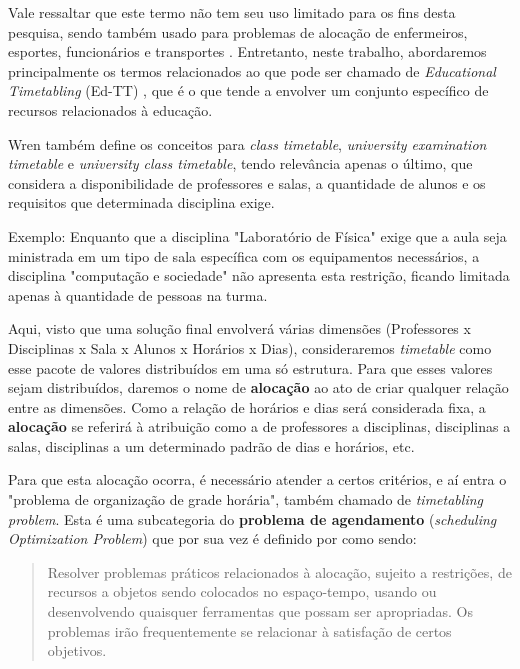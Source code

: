 Vale ressaltar que este termo não tem seu uso limitado para os fins desta pesquisa, sendo também usado para problemas de alocação de enfermeiros, esportes, funcionários e transportes \cite{arratia-martinez_university_2021}. Entretanto, neste trabalho, abordaremos principalmente os termos relacionados ao que pode ser chamado de \textit{Educational Timetabling} (Ed-TT) \cite{alencar_visualization_2019}, que é o que tende a envolver um conjunto específico de recursos relacionados à educação.


Wren também define os conceitos para \textit{class timetable}, \textit{university examination timetable} e \textit{university class timetable}, tendo relevância apenas o último, que considera a disponibilidade de professores e salas, a quantidade de alunos e os requisitos que determinada disciplina exige.

Exemplo: Enquanto que a disciplina "Laboratório de Física" exige que a aula seja ministrada em um tipo de sala específica com os equipamentos necessários, a disciplina "computação e sociedade" não apresenta esta restrição, ficando limitada apenas à quantidade de pessoas na turma.

Aqui, visto que uma solução final envolverá várias dimensões (Professores x Disciplinas x Sala x Alunos x Horários x Dias), consideraremos \textit{timetable} como esse pacote de valores distribuídos em uma só estrutura. Para que esses valores sejam distribuídos, daremos o nome de \textbf{alocação} ao ato de criar qualquer relação entre as dimensões. Como a relação de horários e dias será considerada fixa, a \textbf{alocação} se referirá à atribuição como a de professores a disciplinas, disciplinas a salas, disciplinas a um determinado padrão de dias e horários, etc.

Para que esta alocação ocorra, é necessário atender a certos critérios, e aí entra o "problema de organização de grade horária", também chamado de \textit{timetabling problem}. Esta é uma subcategoria do \textbf{problema de agendamento} (\textit{scheduling Optimization Problem}) \cite{alencar_visualization_2019} que por sua vez é definido por \cite{goos_scheduling_1996} como sendo:

\begin{quote}\footnotesize
  Resolver problemas práticos relacionados à alocação, sujeito a restrições, de recursos a objetos sendo colocados no espaço-tempo, usando ou desenvolvendo quaisquer ferramentas que possam ser apropriadas. Os problemas irão frequentemente se relacionar à satisfação de certos objetivos.
\end{quote}

